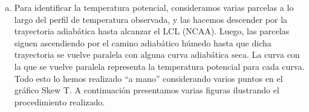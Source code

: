\documentclass[../main.tex]{subfiles}
\begin{document}
\begin{enumerate}[a)]
    \item Para identificar la temperatura potencial, consideramos varias parcelas a lo largo del perfil de temperatura observada, y las hacemos descender por la trayectoria adiabática hasta alcanzar el LCL (NCAA). Luego, las parcelas siguen ascendiendo por el camino adiabático húmedo hasta que dicha trayectoria se vuelve paralela con alguna curva adiabática seca. La curva con la que se vuelve paralela representa la temperatura potencial para cada curva. \\

    Todo esto lo hemos realizado ``a mano'' considerando varios puntos en el gráfico Skew T. A continuación presentamos varias figuras ilustrando el procedimiento realizado.\\


\end{enumerate}
\end{document}
